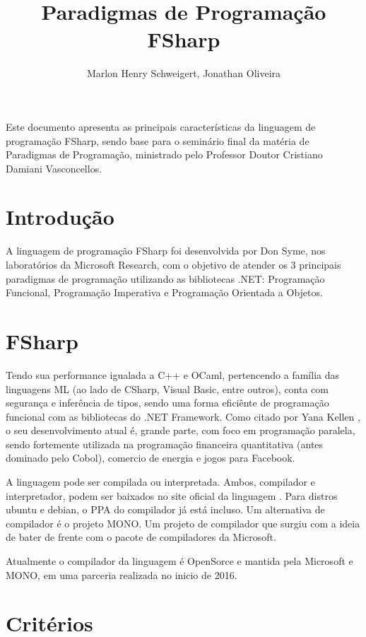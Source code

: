 \documentclass[12pt]{article}
\title{Paradigmas de Programação \\ FSharp}
\author{Marlon Henry Schweigert, Jonathan Oliveira}
\begin{document}
 
\lstset{language=FSharp}

\maketitle

     
\begin{resumo} 
Este documento apresenta as principais características da linguagem de programação FSharp, sendo base para o seminário final da matéria de Paradigmas de Programação, ministrado pelo Professor Doutor Cristiano Damiani Vasconcellos.
\end{resumo}


\section{Introdução}

A linguagem de programação FSharp foi desenvolvida por Don Syme, nos laboratórios da Microsoft Research, com o objetivo de atender os 3 principais paradigmas de programação utilizando as bibliotecas .NET: Programação Funcional, Programação Imperativa e Programação Orientada a Objetos.


\section{FSharp}

Tendo sua performance igualada a C++ e OCaml, pertencendo a família das linguagens ML (ao lado de CSharp, Visual Basic, entre outros), conta com segurança e inferência de tipos, sendo uma forma eficiênte de programação funcional com as bibliotecas do .NET Framework. Como citado por Yana Kellen \cite{yanakellen}, o seu desenvolvimento atual é, grande parte, com foco em programação paralela, sendo fortemente utilizada na programação financeira quantitativa (antes dominado pelo Cobol), comercio de energia e jogos para Facebook.

A linguagem pode ser compilada ou interpretada. Ambos, compilador e interpretador, podem ser baixados no site oficial da linguagem \cite{fsharp}. Para distros ubuntu e debian, o PPA do compilador já está incluso. Um alternativa de compilador é o projeto MONO. Um projeto de compilador que surgiu com a ideia de bater de frente com o pacote de compiladores da Microsoft.

Atualmente o compilador da linguagem é OpenSorce e mantida pela Microsoft e MONO, em uma parceria realizada no inicio de 2016.

\section{Critérios}
\end{document}
